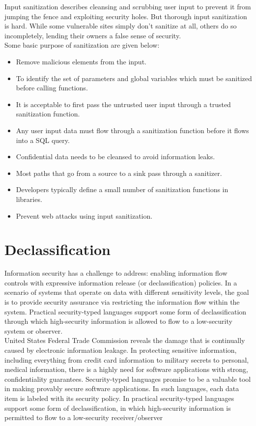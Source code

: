 Input sanitization describes cleansing and scrubbing user input to prevent it from jumping the fence and exploiting security holes. But thorough input sanitization is hard. While some vulnerable sites simply don't sanitize at all, others do so incompletely, lending their owners a false sense of security.\\

Some basic purpose of sanitization are given below:
\begin{itemize}
	\item Remove malicious elements from the input.
	\item To identify the set of parameters and global variables which must be sanitized before calling functions.
	\item It is acceptable to first pass the untrusted user input through a trusted sanitization function.	
	\item Any user input data must flow through a sanitization function before it flows into a SQL query.
	\item Confidential data needs to be cleansed to avoid information leaks.
	\item Most paths that go from a source to a sink pass through a sanitizer.
	\item Developers typically define a small number of sanitization functions in libraries.
	\item Prevent web attacks using input sanitization.
\end{itemize}

\section{Declassification}
Information security has a challenge to address: enabling information flow controls with expressive information release (or declassification) policies. In a scenario of systems that operate on data with different sensitivity levels, the goal is to provide security assurance via restricting the information flow within the system. Practical security-typed languages support some form of declassification through which high-security information is allowed to flow to a low-security system or observer.\\

United States Federal Trade Commission reveals the damage that is continually caused by electronic information leakage. In protecting sensitive information, including everything from credit card information to military secrets to personal, medical information, there is a highly
need for software applications with strong, confidentiality guarantees.
Security-typed languages promise to be a valuable tool in making provably secure software applications. In such languages, each
data item is labeled with its security policy. In practical security-typed languages support some form of declassification, in which high-security information is permitted to flow to a low-security receiver/observer \\

